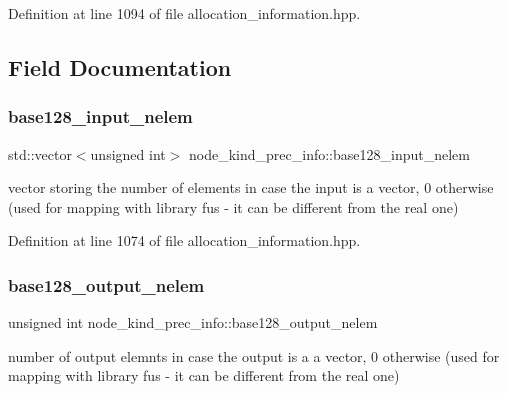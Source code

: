 Definition at line 1094 of file allocation\+\_\+information.\+hpp.



\subsection{Field Documentation}
\mbox{\label{structnode__kind__prec__info_a762c64140f1818d73e3a55bd1a3817bb}} 
\subsubsection{\texorpdfstring{base128\+\_\+input\+\_\+nelem}{base128\_input\_nelem}}
{\footnotesize\ttfamily std\+::vector$<$unsigned int$>$ node\+\_\+kind\+\_\+prec\+\_\+info\+::base128\+\_\+input\+\_\+nelem}



vector storing the number of elements in case the input is a vector, 0 otherwise (used for mapping with library fus -\/ it can be different from the real one) 



Definition at line 1074 of file allocation\+\_\+information.\+hpp.

\mbox{\label{structnode__kind__prec__info_a7a28a8d398f231dc13bab0e19886f054}} 
\subsubsection{\texorpdfstring{base128\+\_\+output\+\_\+nelem}{base128\_output\_nelem}}
{\footnotesize\ttfamily unsigned int node\+\_\+kind\+\_\+prec\+\_\+info\+::base128\+\_\+output\+\_\+nelem}



number of output elemnts in case the output is a a vector, 0 otherwise (used for mapping with library fus -\/ it can be different from the real one) 



